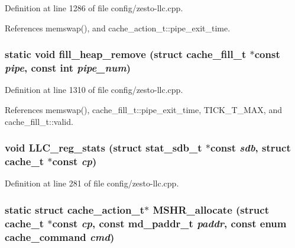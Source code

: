 Definition at line 1286 of file config/zesto-llc.cpp.

References memswap(), and cache\_\-action\_\-t::pipe\_\-exit\_\-time.
\subsubsection[{fill\_\-heap\_\-remove}]{\setlength{\rightskip}{0pt plus 5cm}static void fill\_\-heap\_\-remove (struct {\bf cache\_\-fill\_\-t} $\ast$const  {\em pipe}, \/  const int {\em pipe\_\-num})\hspace{0.3cm}{\tt  [static]}}\label{config_2zesto-llc_8cpp_9c8931eb6f26a4862221d39dd688368f}




Definition at line 1310 of file config/zesto-llc.cpp.

References memswap(), cache\_\-fill\_\-t::pipe\_\-exit\_\-time, TICK\_\-T\_\-MAX, and cache\_\-fill\_\-t::valid.
\subsubsection[{LLC\_\-reg\_\-stats}]{\setlength{\rightskip}{0pt plus 5cm}void LLC\_\-reg\_\-stats (struct {\bf stat\_\-sdb\_\-t} $\ast$const  {\em sdb}, \/  struct {\bf cache\_\-t} $\ast$const  {\em cp})}\label{config_2zesto-llc_8cpp_0a1aa47236ccba0a1d5e5818052a830d}




Definition at line 281 of file config/zesto-llc.cpp.
\subsubsection[{MSHR\_\-allocate}]{\setlength{\rightskip}{0pt plus 5cm}static struct {\bf cache\_\-action\_\-t}$\ast$ MSHR\_\-allocate (struct {\bf cache\_\-t} $\ast$const  {\em cp}, \/  const {\bf md\_\-paddr\_\-t} {\em paddr}, \/  const enum {\bf cache\_\-command} {\em cmd})\hspace{0.3cm}{\tt  [static, read]}}\label{config_2zesto-llc_8cpp_b9e90f1afc77db8eb4dad712b12304ac}





